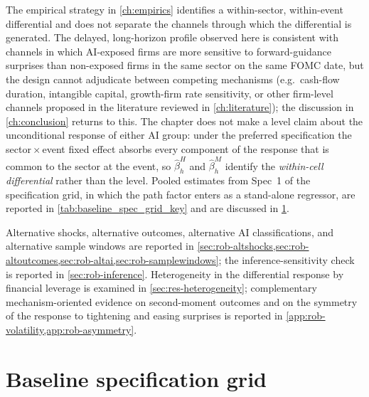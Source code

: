 The empirical strategy in \cref{ch:empirics} identifies a within-sector,
within-event differential and does not separate the channels through
which the differential is generated. The delayed, long-horizon profile
observed here is consistent with channels in which AI-exposed firms are
more sensitive to forward-guidance surprises than non-exposed firms in
the same sector on the same FOMC date, but the design cannot adjudicate
between competing mechanisms (e.g.\ cash-flow duration, intangible
capital, growth-firm rate sensitivity, or other firm-level channels
proposed in the literature reviewed in \cref{ch:literature}); the
discussion in \cref{ch:conclusion} returns to this. The chapter does not
make a level claim about the unconditional response of either AI group:
under the preferred specification the sector\,$\times$\,event fixed
effect absorbs every component of the response that is common to the
sector at the event, so $\hat\beta_h^H$ and $\hat\beta_h^M$ identify the
\emph{within-cell differential} rather than the level. Pooled estimates
from Spec~1 of the specification grid, in which the path factor enters as
a stand-alone regressor, are reported in \cref{tab:baseline_spec_grid_key}
and are discussed in \cref{sec:res-specgrid}.

Alternative shocks, alternative outcomes, alternative AI
classifications, and alternative sample windows are reported in
\cref{sec:rob-altshocks,sec:rob-altoutcomes,sec:rob-altai,sec:rob-samplewindows};
the inference-sensitivity check is reported in
\cref{sec:rob-inference}. Heterogeneity in the differential response
by financial leverage is examined in \cref{sec:res-heterogeneity};
complementary mechanism-oriented evidence on second-moment outcomes
and on the symmetry of the response to tightening and easing
surprises is reported in
\cref{app:rob-volatility,app:rob-asymmetry}.
 

\section{Baseline specification grid}
\label{sec:res-specgrid}

